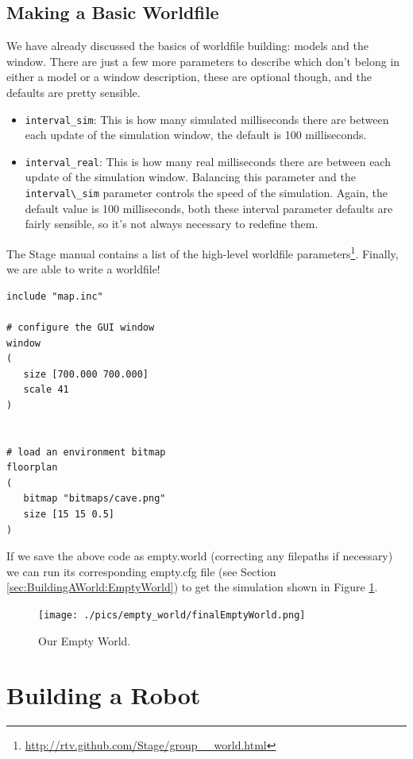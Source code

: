 \documentclass[a4paper]{report}
\begin{document}
\subsection{Making a Basic Worldfile}\label{sec:BuildingAWorld:EmptyWorld:BasicWorldfile}

We have already discussed the basics of worldfile building: models and the window. There are just a few more parameters to describe which don't belong in either a model or a window description, these are optional though, and the defaults are pretty sensible.
\begin{itemize}
\item \verb|interval_sim|: This is how many simulated milliseconds there are between each update of the simulation window, the default is 100 milliseconds.
\item \verb|interval_real|: This is how many real milliseconds there are between each update of the simulation window. Balancing this parameter and the \verb|interval\_sim| parameter controls the speed of the simulation. Again, the default value is 100 milliseconds, both these interval parameter defaults are fairly sensible, so it's not always necessary to redefine them.
\end{itemize}
The Stage manual contains a list of the high-level worldfile parameters\footnote{\url{http://rtv.github.com/Stage/group__world.html}}.\newline
Finally, we are able to write a worldfile!
\begin{verbatim}
include "map.inc"

# configure the GUI window
window
( 
   size [700.000 700.000] 
   scale 41
)


# load an environment bitmap
floorplan
(
   bitmap "bitmaps/cave.png" 
   size [15 15 0.5]
)
\end{verbatim}
If we save the above code as empty.world (correcting any filepaths if necessary) we can run its corresponding empty.cfg file (see Section \ref{sec:BuildingAWorld:EmptyWorld}) to get the simulation shown in Figure \ref{fig:BuildingAWorld:EmptyWorld:BasicWorldfile:FinalEmptyWorld}.

\begin{figure}
	\centering
	\texttt{[image: ./pics/empty\_world/finalEmptyWorld.png]} 
	\caption{Our Empty World.}
	\label{fig:BuildingAWorld:EmptyWorld:BasicWorldfile:FinalEmptyWorld}
\end{figure}



\section{Building a Robot} \label{sec:BuildingAWorld:BuildingRobot}
\end{document}
